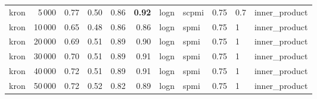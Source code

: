 \begin{tabular}{lrrrrrlllll}
    kron &            5\,000 &  0.77 &  0.50 &       0.86 &           \textbf{0.92} &  logn &  scpmi &    0.75 &  0.7 &  inner\_product \\
    kron &           10\,000 &  0.65 &  0.48 &       0.86 &           0.86 &  logn &   spmi &    0.75 &    1 &  inner\_product \\
    kron &           20\,000 &  0.69 &  0.51 &       0.89 &           0.90 &  logn &   spmi &    0.75 &    1 &  inner\_product \\
    kron &           30\,000 &  0.70 &  0.51 &       0.89 &           0.91 &  logn &   spmi &    0.75 &    1 &  inner\_product \\
    kron &           40\,000 &  0.72 &  0.51 &       0.89 &           0.91 &  logn &   spmi &    0.75 &    1 &  inner\_product \\
    kron &           50\,000 &  0.72 &  0.52 &       0.82 &           0.89 &  logn &   spmi &    0.75 &    1 &  inner\_product \\
\bottomrule
\end{tabular}
